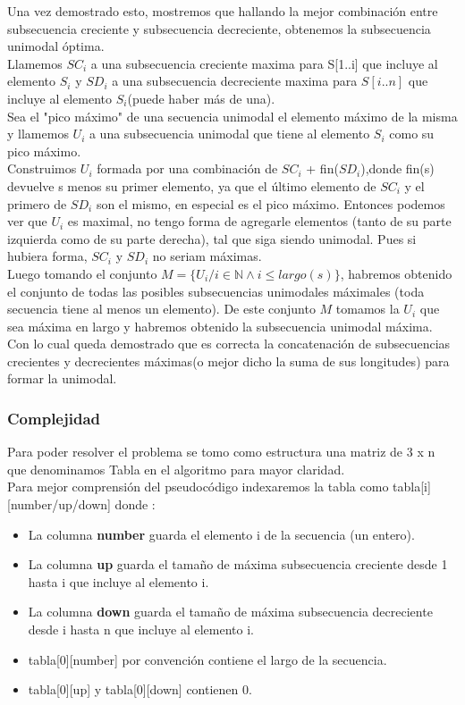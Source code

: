 Una vez demostrado esto, mostremos que hallando la mejor combinación entre subsecuencia creciente y subsecuencia decreciente, obtenemos la subsecuencia unimodal óptima.\\
Llamemos $SC_i$ a una subsecuencia creciente maxima para S[1..i] que incluye al elemento $S_i$ y $SD_i$ a una subsecuencia decreciente maxima para $S[i..n]$ que incluye al elemento $S_i$(puede haber más de una).\\
Sea el "pico máximo" de una secuencia unimodal el elemento máximo de la misma y llamemos $U_i$ a una subsecuencia unimodal que tiene al elemento $S_i$ como su pico máximo.\\
Construimos $U_i$ formada por una combinación de $SC_i$ + fin($SD_i$),donde fin(s) devuelve s menos su primer elemento, ya que el último elemento de $SC_i$ y el primero de $SD_i$ son el mismo, en especial es el pico máximo. Entonces podemos ver que $U_i$ es maximal, no tengo forma de agregarle elementos (tanto de su parte izquierda como de su parte derecha), tal que siga siendo unimodal. Pues si hubiera forma, $SC_i$ y $SD_i$ no seriam máximas.\\
Luego tomando el conjunto $M = \{U_i / i \in \mathbb{N} \land i \le largo(s)\}$, habremos obtenido el conjunto de todas las posibles subsecuencias unimodales máximales (toda secuencia tiene al menos un elemento). De este conjunto $M$ tomamos la $U_i$ que sea máxima en largo y habremos obtenido la subsecuencia unimodal máxima. Con lo cual queda demostrado que es correcta la concatenación de subsecuencias crecientes y decrecientes máximas(o mejor dicho la suma de sus longitudes) para formar la unimodal.
\subsubsection{Complejidad}
Para poder resolver el problema se tomo como estructura una matriz de 3 x n que denominamos Tabla en el algoritmo para mayor claridad.\\
Para mejor comprensión del pseudocódigo indexaremos la tabla como tabla[i][number/up/down] donde :
\begin{itemize}
\item La columna \textbf{number} guarda el elemento i de la secuencia (un entero).
\item La columna \textbf{up} guarda el tamaño de máxima subsecuencia creciente desde 1 hasta i que incluye al elemento i.
\item La columna \textbf{down} guarda el tamaño de máxima subsecuencia decreciente desde i hasta n que incluye al elemento i. 
\item tabla[0][number] por convención contiene el largo de la secuencia.
\item tabla[0][up] y tabla[0][down] contienen 0.
\end{itemize}

